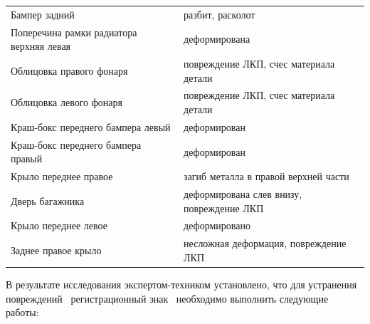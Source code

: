 {\begin{table}[H]
\begin{longtable}{@{}ll@{}}
			Бампер задний                            & разбит, расколот                             \\
			Поперечина рамки радиатора верхняя левая & деформирована                                \\
			Облицовка правого фонаря                 & повреждение ЛКП, счес материала детали       \\
			Облицовка левого фонаря                  & повреждение ЛКП, счес материала детали       \\
			Краш-бокс переднего бампера левый        & деформирован                                 \\
			Краш-бокс переднего бампера правый       & деформирован                                 \\
			Крыло переднее правое                    & загиб металла в правой верхней части         \\
			Дверь багажника                          & деформирована слев внизу, повреждение ЛКП    \\
			Крыло переднее левое                     & деформировано                                \\
			Заднее правое крыло                      & несложная деформация, повреждение ЛКП        \\ \bottomrule
		\end{longtable}
\end{table}}

\pagebreak
\par В результате исследования   экспертом-техником установлено, что для устранения повреждений \, регистрационный знак  \, необходимо  выполнить следующие  работы:

